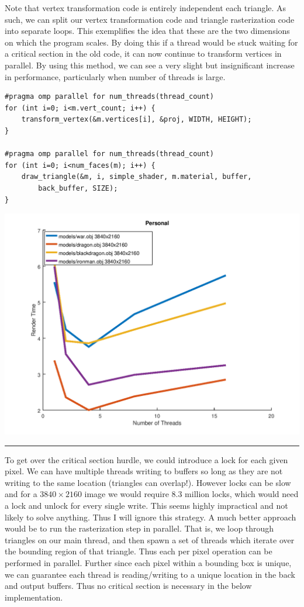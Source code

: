 \documentclass[12pt]{article}
\begin{document}
Note that vertex transformation code is entirely independent each triangle. As such, we can split
our vertex transformation code and triangle rasterization code into separate loops. 
This exemplifies the idea that these are the two dimensions on which the program scales. By doing
this if a thread would be stuck waiting for a critical section in the old code, it can now continue
to transform vertices in parallel. By using this method, we can see a very slight but insignificant
increase in performance, particularly when number of threads is large.

\begin{verbatim}
#pragma omp parallel for num_threads(thread_count)
for (int i=0; i<m.vert_count; i++) {
	transform_vertex(&m.vertices[i], &proj, WIDTH, HEIGHT);
}

#pragma omp parallel for num_threads(thread_count)
for (int i=0; i<num_faces(m); i++) {
	draw_triangle(&m, i, simple_shader, m.material, buffer, 
		back_buffer, SIZE);
}
\end{verbatim}

\begin{center}
	\includegraphics[scale=0.5]{parallel1_personal.png}
\end{center}
\textcolor[RGB]{200,200,200}{\rule{\textwidth}{0.75pt}}\bigbreak

To get over the critical section hurdle, we could introduce a lock 
for each given pixel. We can have multiple threads writing to buffers
so long as they are not writing to the same location (triangles can overlap!).
However locks can be slow and for a $3840\times2160$ image we would require 8.3 million
locks, which would need a lock and unlock for every single write. This seems highly
impractical and not likely to solve anything. Thus I will ignore this strategy.
\bigbreak
A much better approach would be to run the rasterization step in parallel. That is,
we loop through triangles on our main thread, and then spawn a set of threads which 
iterate over the bounding region of that triangle. Thus each per pixel operation can be
performed in parallel. Further since each pixel within a bounding box is unique, we can 
guarantee each thread is reading/writing to a unique location in the back and output buffers.
Thus no critical section is necessary in the below implementation.
\end{document}
